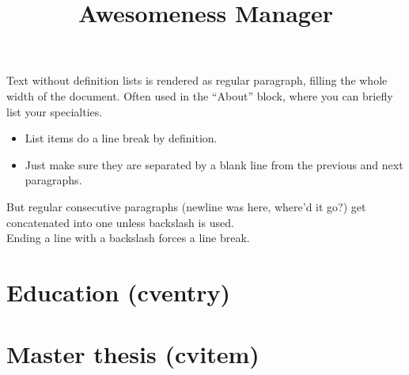 \documentclass[10pt,a4paper,sans,colorlinks=true]{moderncv}        %
\title{Awesomeness Manager}
\providecommand{\tightlist}{}
\begin{document}
\hypersetup{urlcolor=color1_dark}                               %
\makecvtitle

Text without definition lists is rendered as regular paragraph, filling
the whole width of the document. Often used in the ``About'' block,
where you can briefly list your specialties.

\begin{itemize}
\tightlist
\item
  List items do a line break by definition.
\item
  Just make sure they are separated by a blank line from the previous
  and next paragraphs.
\end{itemize}

But regular consecutive paragraphs (newline was here, where'd it go?)
get concatenated into one unless backslash is used.\\
Ending a line with a backslash forces a line break.

\section{Education (cventry)}\label{education-cventry}



\section{Master thesis (cvitem)}\label{master-thesis-cvitem}



\end{document}
